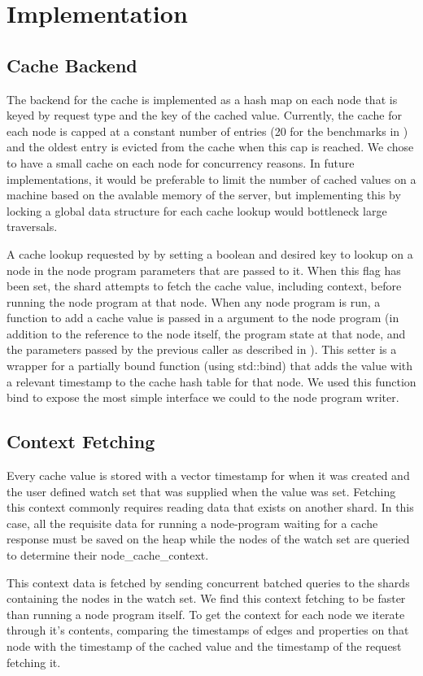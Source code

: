\documentclass[letterpaper,twocolumn,11pt,tight]{article}
\begin{document}
\section{Implementation}\label{sec:design}
\subsection{Cache Backend}
The backend for the cache is implemented as a hash map on each node that is keyed by request type and the key of the cached value.
Currently, the cache for each node is capped at a constant number of entries (20 for the benchmarks in ) and the oldest entry is evicted from the cache when this cap is reached.
We chose to have a small cache on each node for concurrency reasons. In future implementations, it would be preferable to limit the number of cached values on a machine based on the avalable memory of the server, but implementing this by locking a global data structure for each cache lookup would bottleneck large traversals.

A cache lookup requested by by setting a boolean and desired key to lookup on a node in the node program parameters that are passed to it.
When this flag has been set, the shard attempts to fetch the cache value, including context, before running the node program at that node. When any node program is run, a function to add a cache value is passed in a argument to the node program (in addition to the reference to the node itself, the program state at that node, and the parameters passed by the previous caller as described in ). This setter is a wrapper for a partially bound function (using std::bind) that adds the value with a relevant timestamp to the cache hash table for that node.
We used this function bind to expose the most simple interface we could to the node program writer. 
\subsection{Context Fetching}
Every cache value is stored with a vector timestamp for when it was created and the user defined watch set that was supplied when the value was set. Fetching this context commonly requires reading data that exists on another shard. In this case, all the requisite data for running a node-program waiting for a cache response must be saved on the heap while the nodes of the watch set are queried to determine their node\_cache\_context.

This context data is fetched by sending concurrent batched queries to the shards containing the nodes in the watch set. We find this context fetching to be faster than running a node program itself.
To get the context for each node we iterate through it's contents, comparing the timestamps of edges and properties on that node with the timestamp of the cached value and the timestamp of the request fetching it. %
\end{document}
